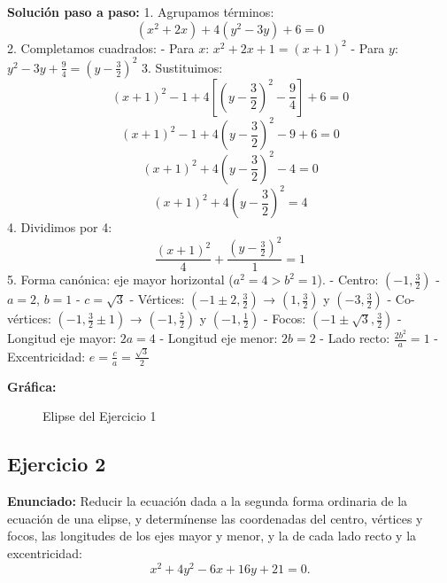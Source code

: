 \documentclass[12pt,a4paper]{article}
\begin{document}
\textbf{Solución paso a paso:}
1. Agrupamos términos:
   \[
   (x^2 + 2x) + 4(y^2 - 3y) + 6 = 0
   \]
2. Completamos cuadrados:
   - Para \(x\): \(x^2 + 2x + 1 = (x+1)^2\)
   - Para \(y\): \(y^2 - 3y + \frac{9}{4} = \left(y - \frac{3}{2}\right)^2\)
3. Sustituimos:
   \[
   (x+1)^2 - 1 + 4\left[\left(y - \frac{3}{2}\right)^2 - \frac{9}{4}\right] + 6 = 0
   \]
   \[
   (x+1)^2 - 1 + 4\left(y - \frac{3}{2}\right)^2 - 9 + 6 = 0
   \]
   \[
   (x+1)^2 + 4\left(y - \frac{3}{2}\right)^2 - 4 = 0
   \]
   \[
   (x+1)^2 + 4\left(y - \frac{3}{2}\right)^2 = 4
   \]
4. Dividimos por 4:
   \[
   \frac{(x+1)^2}{4} + \frac{\left(y - \frac{3}{2}\right)^2}{1} = 1
   \]
5. Forma canónica: eje mayor horizontal (\(a^2 = 4 > b^2 = 1\)).
   - Centro: \((-1, \frac{3}{2})\)
   - \(a = 2\), \(b = 1\)
   - \(c = \sqrt{3}\)
   - Vértices: \((-1 \pm 2, \frac{3}{2})\) → \((1, \frac{3}{2})\) y \((-3, \frac{3}{2})\)
   - Co-vértices: \((-1, \frac{3}{2} \pm 1)\) → \((-1, \frac{5}{2})\) y \((-1, \frac{1}{2})\)
   - Focos: \((-1 \pm \sqrt{3}, \frac{3}{2})\)
   - Longitud eje mayor: \(2a = 4\)
   - Longitud eje menor: \(2b = 2\)
   - Lado recto: \(\frac{2b^2}{a} = 1\)
   - Excentricidad: \(e = \frac{c}{a} = \frac{\sqrt{3}}{2}\)

\textbf{Gráfica:}
\begin{figure}[H]
\centering
{}
\caption{Elipse del Ejercicio 1}
\end{figure}
\newpage

\subsection{Ejercicio 2}
\textbf{Enunciado:} Reducir la ecuación dada a la segunda forma ordinaria de la ecuación de una elipse, y determínense las coordenadas del centro, vértices y focos, las longitudes de los ejes mayor y menor, y la de cada lado recto y la excentricidad:
\[ x^2 + 4y^2 - 6x + 16y + 21 = 0. \]
\end{document}
